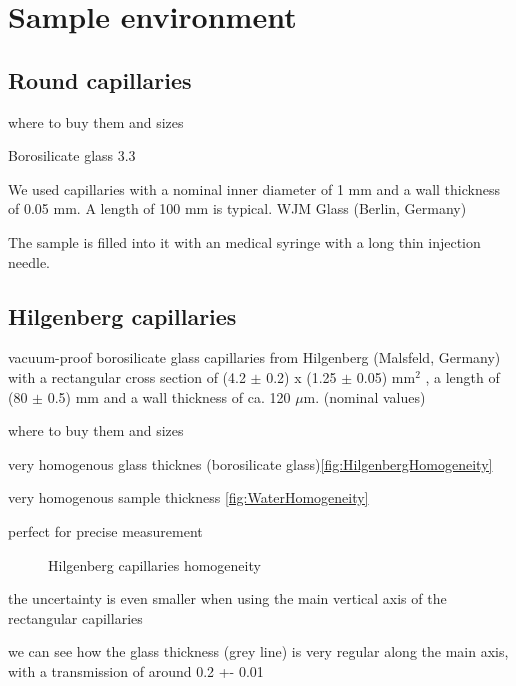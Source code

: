 \section{Sample environment}

\subsection{Round capillaries}

where to buy them and sizes

Borosilicate glass 3.3

We used capillaries with a nominal inner diameter of 1 mm and a wall thickness of 0.05 mm. A length of 100 mm is typical. WJM Glass (Berlin, Germany)

The sample is filled into it with an medical syringe with a long thin injection needle. 


\subsection{Hilgenberg capillaries}


vacuum-proof borosilicate glass capillaries from Hilgenberg (Malsfeld, Germany) with a rectangular cross section of (4.2 $\pm$ 0.2) x (1.25 $\pm$ 0.05) mm$^2$ , a length of (80 $\pm$ 0.5) mm and a wall thickness of ca. 120 $\mu$m. (nominal values)



where to buy them and sizes

very homogenous glass thicknes (borosilicate glass)\ref{fig:HilgenbergHomogeneity}

very homogenous sample thickness \ref{fig:WaterHomogeneity}

perfect for precise measurement

\begin{figure}%
	\centering
		\caption{Hilgenberg capillaries homogeneity}
\end{figure}

the uncertainty is even smaller when using the main vertical axis of the rectangular capillaries

we can see how the glass thickness (grey line) is very regular along the main axis, with a transmission of around 0.2 +- 0.01

